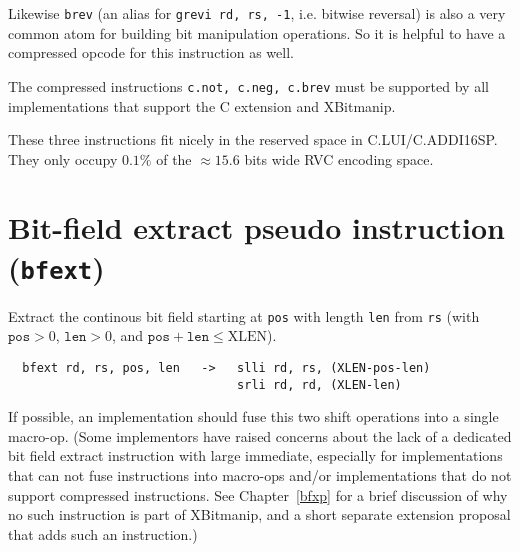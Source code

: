 Likewise \texttt{brev} (an alias for \texttt{grevi\ rd,\ rs,\ -1}, i.e. bitwise
reversal) is also a very common atom for building bit manipulation operations. So it
is helpful to have a compressed opcode for this instruction as well.

The compressed instructions \texttt{c.not,\ c.neg,\ c.brev} must be supported by
all implementations that support the C extension and XBitmanip.



These three instructions fit nicely in the reserved space in C.LUI/C.ADDI16SP.
They only occupy $0.1\%$ of the $\approx15.6$ bits wide RVC encoding space.


\section{Bit-field extract pseudo instruction ({\tt bfext})}
\label{bfext}

Extract the continous bit field starting at {\tt pos} with length {\tt len}
from {\tt rs} (with $\texttt{pos}>0$, $\texttt{len}>0$, and
$\texttt{pos}+\texttt{len}\le\textrm{XLEN}$).

\begin{verbatim}
  bfext rd, rs, pos, len   ->   slli rd, rs, (XLEN-pos-len)
                                srli rd, rd, (XLEN-len)
\end{verbatim}

If possible, an implementation should fuse this two shift operations into a single
macro-op. (Some implementors have raised concerns about the lack of a dedicated
bit field extract instruction with large immediate, especially for implementations
that can not fuse instructions into macro-ops and/or implementations that do
not support compressed instructions. See Chapter~\ref{bfxp} for a brief discussion
of why no such instruction is part of XBitmanip, and a short separate extension
proposal that adds such an instruction.)
